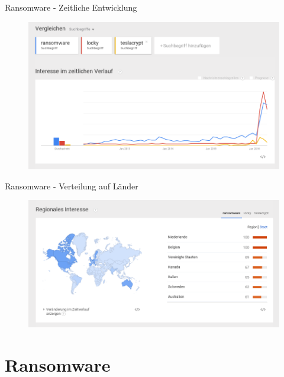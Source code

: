 \documentclass[10pt]{beamer}
\begin{document}
\begin{frame}{Ransomware - Zeitliche Entwicklung}
	\begin{figure}[p]
		\centering
		\includegraphics[scale=0.37]{ransomware_zeitablauf.png}
	\end{figure}
\end{frame}

\begin{frame}{Ransomware - Verteilung auf Länder}
	\begin{figure}[p]
		\centering
		\includegraphics[scale=0.37]{ransomware_laenderverteilung.png}
	\end{figure}
\end{frame}


\section{Ransomware}
\end{document}
